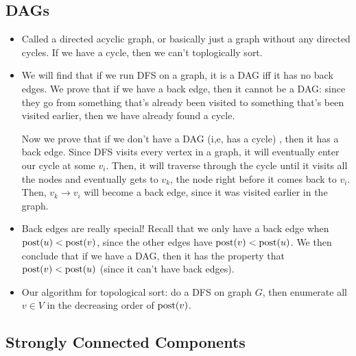 	\subsection{DAGs}
	\begin{itemize}
		\item Called a directed acyclic graph, or basically just a graph without any directed cycles. If 
			we have a cycle, then we can't toplogically sort. 
		\item We will find that if we run DFS on a graph, it is a DAG iff it has no back edges.
			We prove that if we have a back edge, then it cannot be a DAG: since they go from something 
			that's already been visited to something that's been visited earlier, then we have already 
			found a cycle. 

			Now we prove that if we don't have a DAG (i,e, has a cycle) , then it has a back edge. Since DFS
			visits every vertex in 
			a graph, it will eventually enter our cycle at some $v_i$. Then, it will traverse through the cycle
			until it visits all the nodes and eventually gets to $v_k$, the node right before it comes back to 
			$v_i$. 
			Then, $v_k \to v_i$ will become a back edge, since it was visited earlier in the graph.
		\item Back edges are really special! Recall that we only have a back edge when $\mathrm{post}(u) < \mathrm{post}(v)$, 
			since the other edges have $\mathrm{post}(v) < \mathrm{post}(u)$. We then conclude that if we have a DAG, then 
			it has the property that $\mathrm{post}(v) < \mathrm{post}(u)$ (since it can't have back edges). 
			

		\item Our algorithm for topological sort: do a DFS on graph $G$, then enumerate all $v \in V$ in 
			the decreasing order of $\mathrm{post}(v)$. 
	\end{itemize}

	\subsection{Strongly Connected Components}
	
